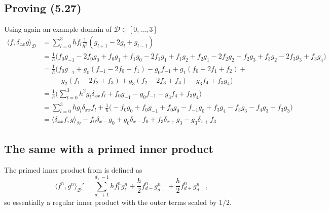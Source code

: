 \documentclass[dvipsnames]{article}
\begin{document}
\subsection{Proving (5.27)}
Using again an example domain of $\mathcal{D}\in [0,\hdots,3]$ 
\begin{equation}
    \begin{aligned}
        \langle f,\delta_{xx}g \rangle_\mathcal{D} &= \sum_{l=0}^3 h f_l\frac{1}{h^2}(g_{l+1}-2g_l+g_{l-1})\\
        &= \frac{1}{h}\Big(f_0g_{-1} - 2 f_0g_0 + f_0g_1 + f_1g_0 - 2 f_1g_1 + f_1g_2+ f_2g_{1} - 2 f_2g_2 + f_2g_3 + f_3g_2 - 2f_3g_3 + f_3g_4 \Big)\\
        &=\frac{1}{h}\Big(f_0g_{-1} + g_0(f_{-1}-2f_0+f_1) - g_0f_{-1} + g_1(f_0-2f_1+f_2)+\\
        &\qquad\ \ \;g_2(f_1-2f_2+f_3)+ g_3(f_2-2f_3+f_4) - g_3f_4 + f_3g_4\Big)\\
        &=\frac{1}{h}\Big(\sum_{l=0}^3 h^2 g_l\delta_{xx}f_l + f_0g_{-1}-g_0f_{-1} - g_3f_4 + f_3g_4\Big)\\
        &= \sum_{l=0}^3 h g_l\delta_{xx}f_l + \frac{1}{h}\Big(-f_0g_0+f_0g_{-1}+f_0g_0-f_{-1}g_0+f_3g_4-f_3g_3-f_4g_3+f_3g_3\Big)\\
        &= \langle \delta_{xx}f, g \rangle_{\mathcal{D}} -f_0\delta_{x-}g_0+g_0\delta_{x-}f_0+f_3\delta_{x+}g_3-g_3\delta_{x+}f_3    
    \end{aligned}
\end{equation}
\subsection{The same with a primed inner product}
The primed inner product from \cite{Bilbao2009} is defined as
\begin{equation}
    \langle f^n,g^n \rangle_\mathcal{D}' = \sum_{d_-+1}^{d_+-1}hf_l^ng_l^n+\frac{h}{2}f_{d-}^ng_{d-}^n+\frac{h}{2}f_{d+}^ng_{d+}^n,
\end{equation}
so essentially a regular inner product with the outer terms scaled by $1/2$.
\end{document}
